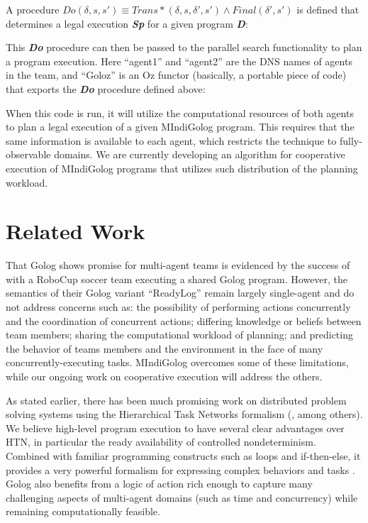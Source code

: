 {\small  }{\small \par}

A procedure $Do(\delta,s,s')\equiv Trans*(\delta,s,\delta',s')\wedge Final(\delta',s')$
is defined that determines a legal execution \textbf{\emph{Sp}} for
a given program \textbf{\emph{D}}:

{\small  }{\small \par}

This \textbf{\emph{Do}} procedure can then be passed to the parallel
search functionality to plan a program execution. Here {}``agent1''
and {}``agent2'' are the DNS names of agents in the team, and {}``Goloz''
is an Oz functor (basically, a portable piece of code) that exports
the \textbf{\emph{Do}} procedure defined above:

{\small  }{\small \par}

When this code is run, it will utilize the computational resources
of both agents to plan a legal execution of a given MIndiGolog program.
This requires that the same information is available to each agent,
which restricts the technique to fully-observable domains. We are
currently developing an algorithm for cooperative execution of MIndiGolog
programs that utilizes such distribution of the planning workload.


\section{Related Work\label{sec:Related-Work}}

That Golog shows promise for multi-agent teams is evidenced by the
success of \cite{Ferrein2005readylog} with a RoboCup soccer team
executing a shared Golog program. However, the semantics of their
Golog variant {}``ReadyLog'' remain largely single-agent and do
not address concerns such as: the possibility of performing actions
concurrently and the coordination of concurrent actions; differing
knowledge or beliefs between team members; sharing the computational
workload of planning; and predicting the behavior of teams members
and the environment in the face of many concurrently-executing tasks.
MIndiGolog overcomes some of these limitations, while our ongoing
work on cooperative execution will address the others.

As stated earlier, there has been much promising work on distributed
problem solving systems using the Hierarchical Task Networks formalism
(\cite{tambe97flexible_teamwork,decker95designing_coordination,grosz99planning_together},
among others). We believe high-level program execution to have several
clear advantages over HTN, in particular the ready availability of
controlled nondeterminism. Combined with familiar programming constructs
such as loops and if-then-else, it provides a very powerful formalism
for expressing complex behaviors and tasks \cite{Gabaldon02htn_in_golog,son00htn_golog}.
Golog also benefits from a logic of action rich enough to capture
many challenging aspects of multi-agent domains (such as time and
concurrency) while remaining computationally feasible.

